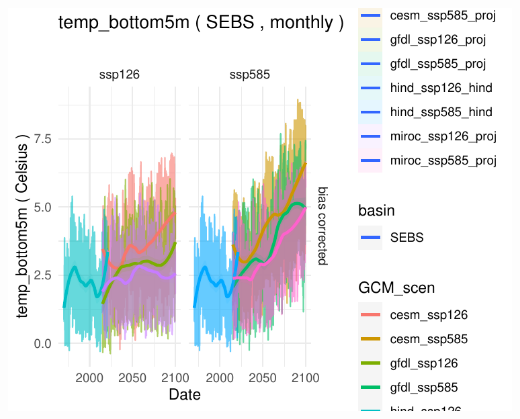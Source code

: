\documentclass[
]{article}
\begin{document}
\begin{center}\includegraphics{ACLIM2_quickStart_files/figure-latex/ewe-1} \end{center}
\end{document}
